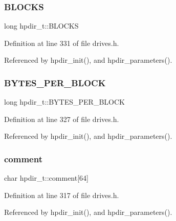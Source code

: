 \subsubsection{\texorpdfstring{B\+L\+O\+C\+KS}{BLOCKS}}
{\footnotesize\ttfamily long hpdir\+\_\+t\+::\+B\+L\+O\+C\+KS}



Definition at line 331 of file drives.\+h.



Referenced by hpdir\+\_\+init(), and hpdir\+\_\+parameters().

\mbox{\label{structhpdir__t_acc3554bcff7efd7615ed958a1af6366a}} 
\subsubsection{\texorpdfstring{B\+Y\+T\+E\+S\+\_\+\+P\+E\+R\+\_\+\+B\+L\+O\+CK}{BYTES\_PER\_BLOCK}}
{\footnotesize\ttfamily long hpdir\+\_\+t\+::\+B\+Y\+T\+E\+S\+\_\+\+P\+E\+R\+\_\+\+B\+L\+O\+CK}



Definition at line 327 of file drives.\+h.



Referenced by hpdir\+\_\+init(), and hpdir\+\_\+parameters().

\mbox{\label{structhpdir__t_aa2ba4f9a627c74e84a515e8ac4893bfb}} 
\subsubsection{\texorpdfstring{comment}{comment}}
{\footnotesize\ttfamily char hpdir\+\_\+t\+::comment\mbox{[}64\mbox{]}}



Definition at line 317 of file drives.\+h.



Referenced by hpdir\+\_\+init(), and hpdir\+\_\+parameters().

\mbox{\label{structhpdir__t_ac153c658b4e5333b529826d125d40e1e}} 
